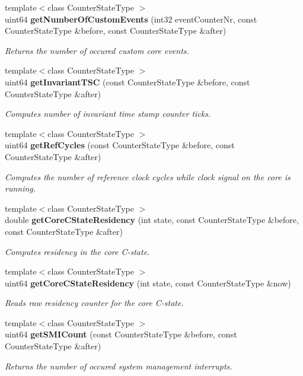 \begin{DoxyCompactItemize}
{\footnotesize template$<$class Counter\+State\+Type $>$ }\\uint64 \textbf{ get\+Number\+Of\+Custom\+Events} (int32 event\+Counter\+Nr, const Counter\+State\+Type \&before, const Counter\+State\+Type \&after)
\begin{DoxyCompactList}\small\item\em Returns the number of occured custom core events. \end{DoxyCompactList}\item 
{\footnotesize template$<$class Counter\+State\+Type $>$ }\\uint64 \textbf{ get\+Invariant\+T\+SC} (const Counter\+State\+Type \&before, const Counter\+State\+Type \&after)
\begin{DoxyCompactList}\small\item\em Computes number of invariant time stamp counter ticks. \end{DoxyCompactList}\item 
{\footnotesize template$<$class Counter\+State\+Type $>$ }\\uint64 \textbf{ get\+Ref\+Cycles} (const Counter\+State\+Type \&before, const Counter\+State\+Type \&after)
\begin{DoxyCompactList}\small\item\em Computes the number of reference clock cycles while clock signal on the core is running. \end{DoxyCompactList}\item 
{\footnotesize template$<$class Counter\+State\+Type $>$ }\\double \textbf{ get\+Core\+C\+State\+Residency} (int state, const Counter\+State\+Type \&before, const Counter\+State\+Type \&after)
\begin{DoxyCompactList}\small\item\em Computes residency in the core C-\/state. \end{DoxyCompactList}\item 
{\footnotesize template$<$class Counter\+State\+Type $>$ }\\uint64 \textbf{ get\+Core\+C\+State\+Residency} (int state, const Counter\+State\+Type \&now)
\begin{DoxyCompactList}\small\item\em Reads raw residency counter for the core C-\/state. \end{DoxyCompactList}\item 
{\footnotesize template$<$class Counter\+State\+Type $>$ }\\uint64 \textbf{ get\+S\+M\+I\+Count} (const Counter\+State\+Type \&before, const Counter\+State\+Type \&after)
\begin{DoxyCompactList}\small\item\em Returns the number of occured system management interrupts. \end{DoxyCompactList}\end{DoxyCompactItemize}


